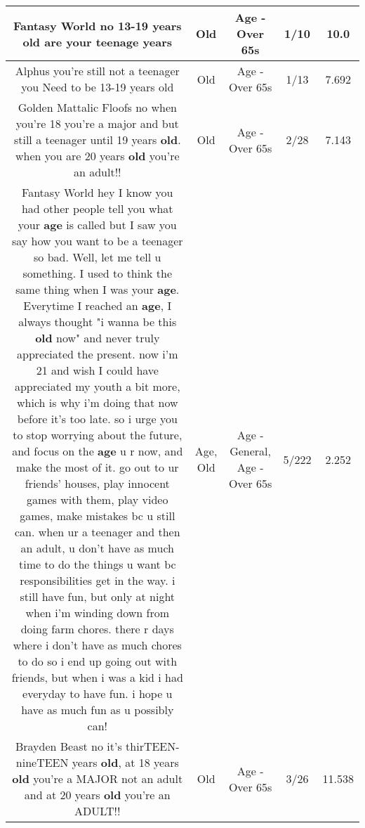 \documentclass[11pt]{article}
\newlength\mylength
\begin{document}
\begin{center}
\begin{longtable}{|C{.65\mylength}|C{.30\mylength}|C{.12\mylength}|C{.12\mylength}|C{.12\mylength}|}
  \small Fantasy World no 13-19 years \textbf{old} are your teenage years\normalsize   & Old & Age - Over 65s & 1/10 & 10.0 \\  \hline
  \small Alphus you're still not a teenager you Need to be 13-19 years old\normalsize   & Old & Age - Over 65s & 1/13 & 7.692 \\  \hline
  \small Golden Mattalic Floofs no when you're 18 you're a major and but still a teenager until 19 years \textbf{old}. when you are 20 years \textbf{old} you're an adult!!\normalsize   & Old & Age - Over 65s & 2/28 & 7.143 \\  \hline
  \small Fantasy World hey I know you had other people tell you what your \textbf{age} is called but I saw you say how you want to be a teenager so bad. Well, let me tell u something. I used to think the same thing when I was your \textbf{age}. Everytime I reached an \textbf{age}, I always thought "i wanna be this \textbf{old} now" and never truly appreciated the present. now i'm 21 and wish I could have appreciated my youth a bit more, which is why i'm doing that now before it's too late. so i urge you to stop worrying about the future, and focus on the \textbf{age} u r now, and make the most of it. go out to ur friends' houses, play innocent games with them, play video games, make mistakes bc u still can. when ur a teenager and then an adult, u don't have as much time to do the things u want bc responsibilities get in the way. i still have fun, but only at night when i'm winding down from doing farm chores. there r days where i don't have as much chores to do so i end up going out with friends, but when i was a kid i had everyday to have fun. i hope u have as much fun as u possibly can!\normalsize   & Age, Old & Age - General, Age - Over 65s & 5/222 & 2.252 \\  \hline
  \small Brayden Beast no it's thirTEEN- nineTEEN years \textbf{old}, at 18 years \textbf{old} you're a MAJOR not an adult and at 20 years \textbf{old} you're an ADULT!!\normalsize   & Old & Age - Over 65s & 3/26 & 11.538 \\  \hline

\end{longtable}
\end{center}
\end{document}
